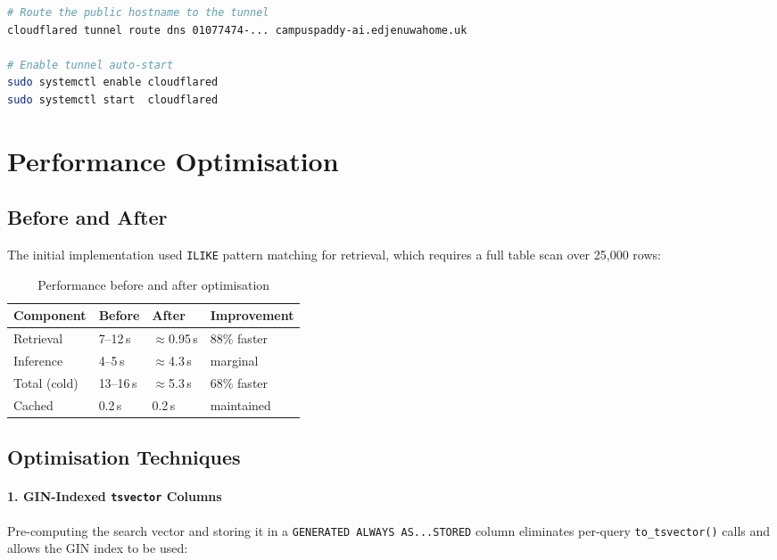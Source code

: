 \documentclass[12pt,a4paper]{report}
\begin{document}
\begin{lstlisting}[language=bash]
# Route the public hostname to the tunnel
cloudflared tunnel route dns 01077474-... campuspaddy-ai.edjenuwahome.uk

# Enable tunnel auto-start
sudo systemctl enable cloudflared
sudo systemctl start  cloudflared
\end{lstlisting}

\chapter{Performance Optimisation}

\section{Before and After}

The initial implementation used \texttt{ILIKE} pattern matching for retrieval, which requires a full table scan over 25,000 rows:

\begin{table}[H]
\centering
\caption{Performance before and after optimisation}
\begin{tabular}{llll}
\toprule
\textbf{Component} & \textbf{Before} & \textbf{After} & \textbf{Improvement} \\
\midrule
Retrieval    & 7--12\,s  & $\approx$0.95\,s & 88\% faster \\
Inference    & 4--5\,s   & $\approx$4.3\,s  & marginal \\
Total (cold) & 13--16\,s & $\approx$5.3\,s  & 68\% faster \\
Cached       & 0.2\,s    & 0.2\,s           & maintained \\
\bottomrule
\end{tabular}
\end{table}

\section{Optimisation Techniques}

\subsubsection{1. GIN-Indexed \texttt{tsvector} Columns}

Pre-computing the search vector and storing it in a \texttt{GENERATED ALWAYS AS...STORED} column eliminates per-query \texttt{to\_tsvector()} calls and allows the GIN index to be used:
\end{document}
